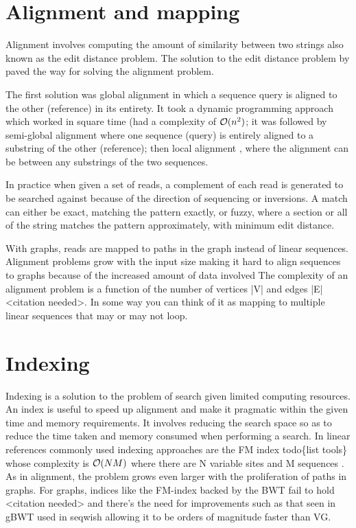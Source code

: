 \documentclass[11pt]{article}
\begin{document}
\section{Alignment and mapping}
\label{sec:org7f3796f}
Alignment involves computing the amount of similarity between two strings also 
known as the edit distance problem.
The solution to the edit distance problem by
\cite{levenshteinBinaryCodesCapable1966a} paved the way for solving the alignment
problem.

The first solution was global alignment
\cite{needlemanGeneralMethodApplicable1970} in which a sequence query is aligned
to the other (reference) in its entirety. It took a dynamic programming approach
which worked in square time (had a complexity of \(\mathcal{O}(n^2)\); it was followed
by semi-global alignment \cite{sellersTheoryComputationEvolutionary1980}
where one sequence (query) is entirely
aligned to a substring of the other (reference); then local alignment
\cite{smithIdentificationCommonMolecular1981}, where the alignment can be between 
any substrings of the two sequences.

In practice when given a set of reads, a complement of each read is generated to 
be searched against because of the direction of sequencing or inversions.
A match can either be exact, matching the pattern exactly, or fuzzy, where a 
section or all of the string matches the pattern approximately, with minimum 
edit distance.

With graphs, reads are mapped to paths in the graph instead of linear sequences.
Alignment problems grow with the input size
\cite{durbinEfficientHaplotypeMatching2014} making it hard to align sequences to
graphs  because of the increased amount of data involved
The complexity of an alignment problem is a function of the
number of  vertices |V| and edges |E| <citation needed>.  In some way you can
think of it as mapping to multiple linear sequences that may or may not loop.

\section{Indexing}
\label{sec:orgb97abf1}
Indexing is a solution to the problem of search given limited computing
resources. An index is useful to speed up alignment and make it pragmatic within
the given time and memory requirements. 
It involves reducing the search space so as to reduce the time taken and memory
consumed when performing a search.
In linear references commonly used indexing approaches are the FM index 
todo\{list tools\} whose complexity is \(\mathcal{O}(NM)\) where there are N variable
sites and M sequences \cite{durbinEfficientHaplotypeMatching2014}.
As in alignment, the problem grows even larger with the proliferation of paths 
in graphs. For graphs, indices like the FM-index backed by the BWT fail to hold
<citation needed> and there’s the need for improvements such as that seen in
gBWT used in seqwish allowing it to be orders of magnitude faster than VG.
\end{document}
